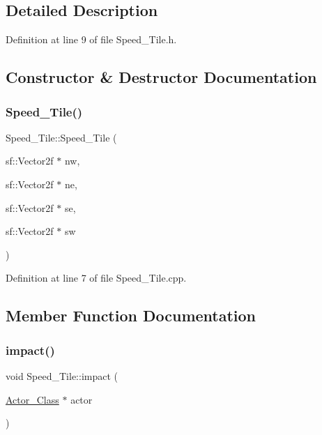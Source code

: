 \subsection{Detailed Description}


Definition at line 9 of file Speed\+\_\+\+Tile.\+h.



\subsection{Constructor \& Destructor Documentation}
\hypertarget{class_speed___tile_a296bb700865d7f78df9cdd830102aafd}{}\label{class_speed___tile_a296bb700865d7f78df9cdd830102aafd} 
\subsubsection{\texorpdfstring{Speed\+\_\+\+Tile()}{Speed\_Tile()}}
{\footnotesize\ttfamily Speed\+\_\+\+Tile\+::\+Speed\+\_\+\+Tile (\begin{DoxyParamCaption}\item[{sf\+::\+Vector2f $\ast$}]{nw,  }\item[{sf\+::\+Vector2f $\ast$}]{ne,  }\item[{sf\+::\+Vector2f $\ast$}]{se,  }\item[{sf\+::\+Vector2f $\ast$}]{sw }\end{DoxyParamCaption})}



Definition at line 7 of file Speed\+\_\+\+Tile.\+cpp.



\subsection{Member Function Documentation}
\hypertarget{class_speed___tile_aea424ba028f29398ace251a3a664b874}{}\label{class_speed___tile_aea424ba028f29398ace251a3a664b874} 
\subsubsection{\texorpdfstring{impact()}{impact()}}
{\footnotesize\ttfamily void Speed\+\_\+\+Tile\+::impact (\begin{DoxyParamCaption}\item[{\hyperlink{class_actor___class}{Actor\+\_\+\+Class} $\ast$}]{actor }\end{DoxyParamCaption})\hspace{0.3cm}{\ttfamily [virtual]}}



